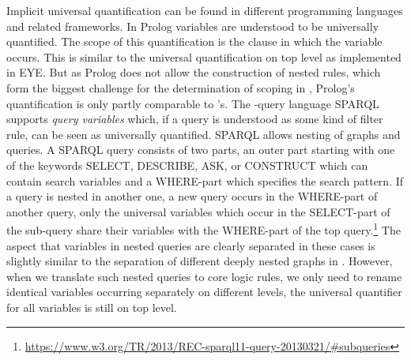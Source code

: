 Implicit universal quantification can be found in different programming languages and \rdf related frameworks.
In Prolog \cite{Prolog} variables are understood to be universally quantified. The scope of this quantification is the clause in which the variable occurs. This 
is similar to the universal quantification on top level as implemented in EYE.
But as Prolog does not allow the construction of nested rules, 
which form the biggest challenge for the determination of scoping in \nthree, Prolog's quantification is only partly comparable to \nthree's. 
%
The \rdf-query language SPARQL \cite{sparql} supports \emph{query variables} which, if a query is understood as some kind of filter rule, can be seen as universally quantified. 
SPARQL allows nesting of graphs and queries. A SPARQL query consists of two parts, an outer part starting with one of the keywords SELECT, DESCRIBE, ASK, or CONSTRUCT 
which can contain search variables and a WHERE-part which specifies 
the search pattern. If a query is nested in another one, \ie a new query occurs in the WHERE-part of another query, only the universal variables which occur in the SELECT-part of the 
sub-query share their variables with the WHERE-part of the top query.\footnote{\url{https://www.w3.org/TR/2013/REC-sparql11-query-20130321/\#subqueries}} 
The aspect that variables in nested queries are clearly separated in these cases is slightly similar to the separation of different deeply nested graphs in \nthree.
However, when we translate such nested queries to core logic rules, we only need to rename identical variables occurring separately on different levels, the universal quantifier for all variables 
is still on top level.

